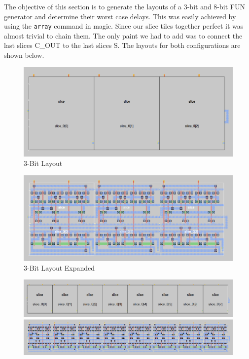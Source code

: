 \documentclass{article}
\begin{document}
The objective of this section is to generate the layouts of a 3-bit and 8-bit
FUN generator and determine their worst case delays. This was easily achieved
by using the \texttt{array} command in magic. Since our slice tiles together
perfect it was almost trivial to chain them. The only paint we had to add was
to connect the last slices C\_OUT to the last slices S. The layouts for both
configurations are shown below.

\begin{figure}[H]
    \centering
    \includegraphics[width=\linewidth]{../part_5/fun_3_slices.png}
    \caption{3-Bit Layout}
\end{figure}

\begin{figure}[H]
    \centering
    \includegraphics[width=\linewidth]{../part_5/fun_3_slices_full.png}
    \caption{3-Bit Layout Expanded}
\end{figure}

\newpage
\begin{figure}[H]
    \centering
    \begin{minipage}[t]{.5\textwidth}
        \centering
        \includegraphics[width=9in, angle=270]{../part_5/fun_8_slices.png}
    \end{minipage}%
    \begin{minipage}[t]{.5\textwidth}
        \centering
        \includegraphics[width=9in, angle=270]{../part_5/fun_8_full.png}
    \end{minipage}%
\end{figure}
\end{document}
